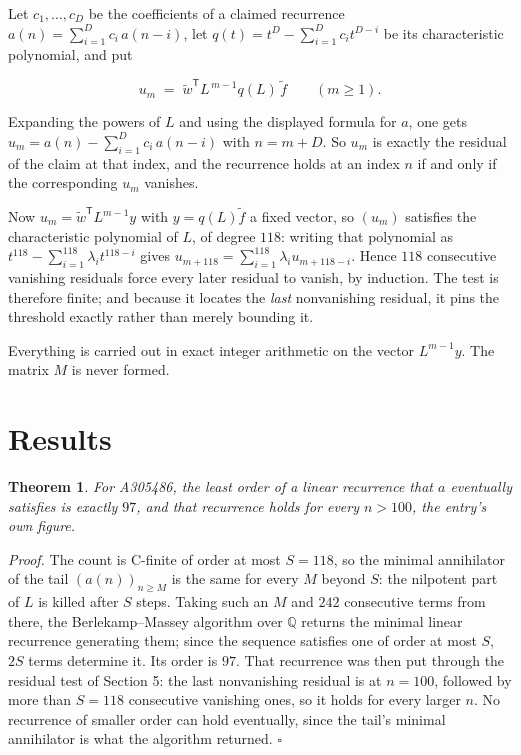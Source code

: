 \documentclass[11pt]{article}
\newtheorem{theorem}{Theorem}
\theoremstyle{definition}
\begin{document}
Let $c_1,\dots,c_D$ be the coefficients of a claimed recurrence $a(n) = \sum_{i=1}^{D} c_i\,a(n-i)$, let $q(t) = t^{D} - \sum_{i=1}^{D} c_i t^{D-i}$ be its characteristic polynomial, and put

\[u_m \;=\; \tilde w^{\mathsf T} L^{\,m-1} q(L)\,\tilde f \qquad (m \ge 1).\]

Expanding the powers of $L$ and using the displayed formula for $a$, one gets $u_m = a(n) - \sum_{i=1}^{D} c_i\,a(n-i)$ with $n = m + D$. So $u_m$ is exactly the residual of the claim at that index, and the recurrence holds at an index $n$ if and only if the corresponding $u_m$ vanishes.

Now $u_m = \tilde w^{\mathsf T} L^{m-1} y$ with $y = q(L)\tilde f$ a fixed vector, so $(u_m)$ satisfies the characteristic polynomial of $L$, of degree $118$: writing that polynomial as $t^{118} - \sum_{i=1}^{118} \lambda_i t^{118-i}$ gives $u_{m+118} = \sum_{i=1}^{118} \lambda_i u_{m+118-i}$. Hence $118$ consecutive vanishing residuals force every later residual to vanish, by induction. The test is therefore finite; and because it locates the {\itshape last} nonvanishing residual, it pins the threshold exactly rather than merely bounding it.

Everything is carried out in exact integer arithmetic on the vector $L^{m-1}y$. The matrix $M$ is never formed.

\section{Results}

\begin{theorem} For A305486, the least order of a linear recurrence that $a$ eventually satisfies is exactly $97$, and that recurrence holds for every $n > 100$, the entry's own figure.\end{theorem}

{\itshape Proof.} The count is C-finite of order at most $S = 118$, so the minimal annihilator of the tail $(a(n))_{n \ge M}$ is the same for every $M$ beyond $S$: the nilpotent part of $L$ is killed after $S$ steps. Taking such an $M$ and $242$ consecutive terms from there, the Berlekamp--Massey algorithm over $\mathbb{Q}$ returns the minimal linear recurrence generating them; since the sequence satisfies one of order at most $S$, $2S$ terms determine it. Its order is $97$. That recurrence was then put through the residual test of Section 5: the last nonvanishing residual is at $n = 100$, followed by more than $S = 118$ consecutive vanishing ones, so it holds for every larger $n$. No recurrence of smaller order can hold eventually, since the tail's minimal annihilator is what the algorithm returned. $\square$
\end{document}
